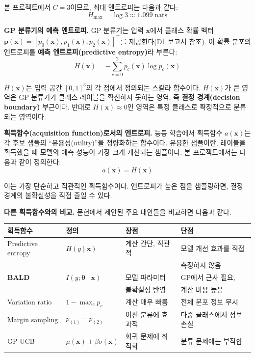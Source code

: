 \documentclass[11pt]{article}
\begin{document}
본 프로젝트에서 $C = 3$이므로, 최대 엔트로피는 다음과 같다:
\[
H_{\text{max}} = \log 3 \approx 1.099 \; \text{nats}
\]

\textbf{GP 분류기의 예측 엔트로피.} GP 분류기는 입력 $\mathbf{x}$에서 클래스 확률 벡터 $\mathbf{p}(\mathbf{x}) = [p_0(\mathbf{x}), p_1(\mathbf{x}), p_2(\mathbf{x})]^\top$를 제공한다(D1 보고서 참조). 이 확률 분포의 엔트로피를 \textbf{예측 엔트로피(predictive entropy)}라 부른다:
\begin{equation}\label{eq:predictive-entropy}
H(\mathbf{x}) = -\sum_{c=0}^{2} p_c(\mathbf{x}) \log p_c(\mathbf{x})
\end{equation}

$H(\mathbf{x})$는 입력 공간 $[0,1]^3$의 각 점에서 정의되는 스칼라 함수이다. $H(\mathbf{x})$가 큰 영역은 GP 분류기가 클래스 레이블을 확신하지 못하는 영역, 즉 \textbf{결정 경계(decision boundary)} 부근이다. 반대로 $H(\mathbf{x}) \approx 0$인 영역은 특정 클래스로 확정적으로 분류되는 영역이다.

\textbf{획득함수(acquisition function)로서의 엔트로피.} 능동 학습에서 획득함수 $a(\mathbf{x})$는 각 후보 샘플의 ``유용성(utility)''을 정량화하는 함수이다. 유용한 샘플이란, 레이블을 획득했을 때 모델의 예측 성능이 가장 크게 개선되는 샘플이다. 본 프로젝트에서는 다음과 같이 정의한다:
\begin{equation}\label{eq:acquisition}
a(\mathbf{x}) = H(\mathbf{x})
\end{equation}

이는 가장 단순하고 직관적인 획득함수이다. 엔트로피가 높은 점을 샘플링하면, 결정 경계의 불확실성을 직접 줄일 수 있다.

\textbf{다른 획득함수와의 비교.} 문헌에서 제안된 주요 대안들을 비교하면 다음과 같다.

\begin{table}[htbp]
\centering
\small
\begin{tabular}{@{}llll@{}}
\toprule
획득함수 & 정의 & 장점 & 단점 \\
\midrule
Predictive entropy & $H(y \mid \mathbf{x})$ & 계산 간단, 직관적 & 모델 개선 효과를 직접 \\
 & & & 측정하지 않음 \\
\textbf{BALD} & $I(y; \boldsymbol{\theta} \mid \mathbf{x})$ & 모델 파라미터 & GP에서 근사 필요, \\
 & & 불확실성 반영 & 계산 비용 높음 \\
Variation ratio & $1 - \max_c p_c$ & 계산 매우 빠름 & 전체 분포 정보 무시 \\
Margin sampling & $p_{(1)} - p_{(2)}$ & 이진 분류에 효과적 & 다중 클래스에서 정보 손실 \\
GP-UCB & $\mu(\mathbf{x}) + \beta \sigma(\mathbf{x})$ & 회귀 문제에 최적화 & 분류 문제에는 부적합 \\
\bottomrule
\end{tabular}
\end{table}
\end{document}

